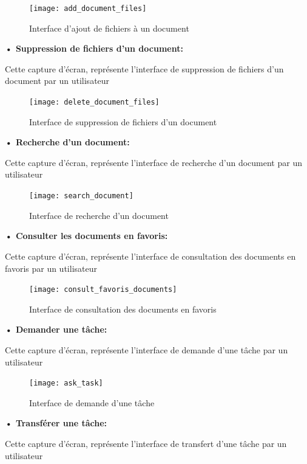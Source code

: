 \begin{figure}[H]
  \centering
  \texttt{[image: add\_document\_files]}
  \caption{Interface d'ajout de fichiers à un document}
  \label{fig:add_document_files}
\end{figure}

\textbf{• Suppression de fichiers d'un document:}

Cette capture d'écran, représente l'interface de suppression de fichiers d'un document par un utilisateur

\begin{figure}[H]
  \centering
  \texttt{[image: delete\_document\_files]}
  \caption{Interface de suppression de fichiers d'un document}
  \label{fig:delete_document_files}
\end{figure}


\textbf{•	Recherche d'un document:}

Cette capture d'écran, représente l'interface de recherche d'un document par un utilisateur

\begin{figure}[H]
  \centering
  \texttt{[image: search\_document]}
  \caption{Interface de recherche d'un document}
  \label{fig:search_document}
\end{figure}

\textbf{•	Consulter les documents en favoris:}

Cette capture d'écran, représente l'interface de consultation des documents en favoris par un utilisateur

\begin{figure}[H]
  \centering
  \texttt{[image: consult\_favoris\_documents]}
  \caption{Interface de consultation des documents en favoris}
  \label{fig:consult_favoris_documents}
\end{figure}

\textbf{•	Demander une tâche:}

Cette capture d'écran, représente l'interface de demande d'une tâche par un utilisateur

\begin{figure}[H]
  \centering
  \texttt{[image: ask\_task]}
  \caption{Interface de demande d'une tâche}
  \label{fig:ask_task}
\end{figure}

\textbf{•	Transférer une tâche:}

Cette capture d'écran, représente l'interface de transfert d'une tâche par un utilisateur

